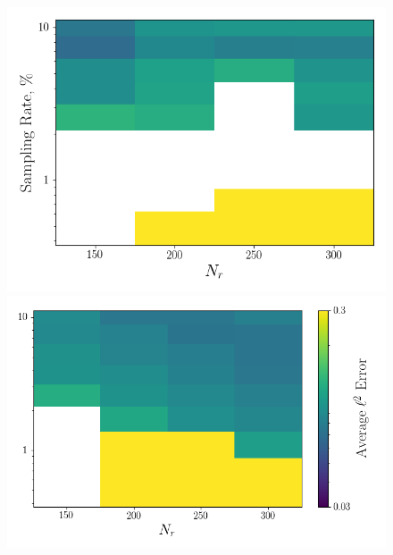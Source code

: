 \begin{figure}
	\begin{minipage}{0.46\linewidth}
		\includegraphics[width=0.99\linewidth]{Chapters/CavityAndCVRC/Images/cavity/deim/err_contour_random_dt1e-5.png}
	\end{minipage}
	\begin{minipage}{0.53\linewidth}
		\includegraphics[width=0.99\linewidth]{Chapters/CavityAndCVRC/Images/cavity/deim/err_contour_eigenvec_dt1e-5.png}
	\end{minipage}


\end{figure}
